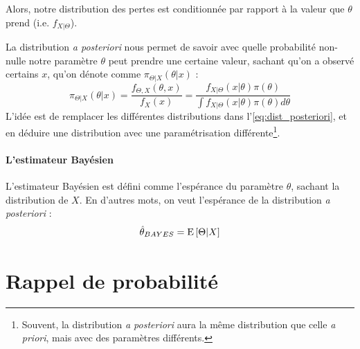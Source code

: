 \documentclass[french, landscape]{article}
\begin{document}
\begin{multicols*}{3}
\begin{definition}
Alors, notre distribution des pertes est conditionnée par rapport à la valeur que $\theta$ prend (i.e. $f_{X|\Theta}$).
\end{definition}


\begin{definition}
La distribution \emph{a posteriori} nous permet de savoir avec quelle probabilité non-nulle notre paramètre $\theta$ peut prendre une certaine valeur, sachant qu'on a observé certains $x$, qu'on dénote comme $\pi_{\Theta | X}(\theta | x)$ : 
\begin{equation}
\label{eq:dist_posteriori}
\pi_{\Theta | X}(\theta | x) = \frac{f_{\Theta, X}(\theta, x)}{f_{X}(x)} = \frac{f_{X|\Theta}(x | \theta) \pi(\theta)}{\int f_{X|\Theta}(x | \theta) \pi(\theta) d \theta} 
\end{equation}
L'idée est de remplacer les différentes distributions dans l'\autoref{eq:dist_posteriori}, et en déduire une distribution avec une paramétrisation différente\footnote{Souvent, la distribution \emph{a posteriori} aura la même distribution que celle \emph{a priori}, mais avec des paramètres différents.}.
\end{definition}

\paragraph{L'estimateur Bayésien} L'estimateur Bayésien est défini comme l'espérance du paramètre $\theta$, sachant la distribution de $X$. En d'autres mots, on veut l'espérance de la distribution \emph{a posteriori} : 
\begin{equation}
\label{eq:estimateur_bayes}
\hat{\theta}_{BAYES} = \mathrm{E} \left[ \Theta | X \right]
\end{equation}

\newpage
 \section{Rappel de probabilité}

\end{multicols*}
\end{document}

